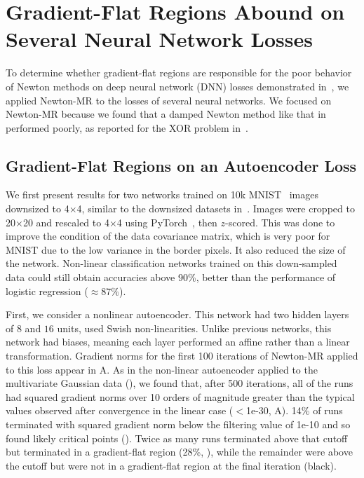 \documentclass[../../thesis.tex]{subfiles}
\begin{document}
\section{Gradient-Flat Regions Abound on Several Neural Network Losses}%

To determine whether gradient-flat regions are
responsible for the poor behavior of Newton methods
on deep neural network (DNN) losses
demonstrated in~,
we applied Newton-MR to the losses of several neural networks.
We focused on Newton-MR because we
found that a damped Newton method like that in~\cite{dauphin2014}
performed poorly, as reported for the XOR problem in~\cite{coetzee1997}.

\subsection{Gradient-Flat Regions on an Autoencoder Loss}

We first present results for two networks
trained on 10k MNIST~\cite{lecun2010} images downsized to 4$\times$4,
similar to the downsized datasets in~\cite{dauphin2014,pennington2017}.
Images were cropped to 20$\times$20 and rescaled to 4$\times$4
using PyTorch~\cite{paszke2019},
then $z$-scored.
This was done to improve the condition of the data covariance matrix,
which is very poor for MNIST due to the low variance in the border pixels.
It also reduced the size of the network.
Non-linear classification networks trained on this down-sampled data
could still obtain accuracies above 90\%,
better than the performance of logistic regression ($\approx87\%$).

First, we consider a nonlinear autoencoder.
This network had two hidden layers of $8$ and $16$ units,
used Swish non-linearities.
Unlike previous networks, this network had biases,
meaning each layer performed an affine rather than a linear transformation.
Gradient norms for the first 100 iterations of Newton-MR
applied to this loss
appear in A.
As in the non-linear autoencoder applied to the multivariate Gaussian data
(),
we found that, after 500 iterations,
all of the runs had squared gradient norms
over 10 orders of magnitude greater than the typical
values observed after convergence in the linear case
($<$1e-30, A).
14\% of runs terminated with squared gradient norm
below the filtering value of 1e-10
and so found likely critical points
(\successcolor{}).
Twice as many runs terminated above that cutoff
but terminated in a gradient-flat region
(28\%, \failcolor{}),
while the remainder were above
the cutoff but were not in a gradient-flat region
at the final iteration
(black).
\end{document}
